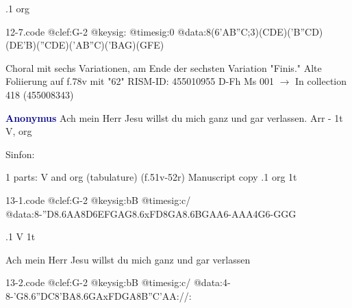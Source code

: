 \documentclass[twocolumn]{book}
\begin{document}
.1  org  
\begin{filecontents*}{12-7.code}
@clef:G-2
@keysig:
@timesig:0
@data:8(6{'AB''C};3)({CDE})({'B''CD})({DE'B})({''CDE})({'AB''C})({'BAG})({GFE})
\end{filecontents*}
\newline
%

\newline Choral mit sechs Variationen, am Ende der sechsten Variation "Finis."
\newline Alte Foliierung auf f.78v mit "62"
\newline RISM-ID: 455010955
\newline D-Fh  Ms 001
\newline $\rightarrow$ In collection 418 (455008343)
      
\newline \par \vspace{7pt} \textcolor{darkblue}{\textbf{Anonymus  }}
\newline Ach mein Herr Jesu willst du mich ganz und gar verlassen. Arr - 1t
\newline V, org
\newline \begin{itshape}[f.51v, at left:] Sinfon:\end{itshape} 
\newline \textcolor{darkblue}{}  1 parts: V and org (tabulature)  (f.51v-52r)
\newline Manuscript copy
.1  org  1t  
\begin{filecontents*}{13-1.code}
@clef:G-2
@keysig:bB
@timesig:c/
@data:8-''D{8.6AA8D6EF}{GAG8.6xFD}{8GA8.6BG}{AA}6-A{AA}4G6-{GGG}
\end{filecontents*}
\newline
%

.1  V  1t
\newline \begin{footnotesize} Ach mein Herr Jesu willst du mich ganz und gar verlassen \end{footnotesize}  
\begin{filecontents*}{13-2.code}
@clef:G-2
@keysig:bB
@timesig:c/
@data:4-8-'G{8.6''DC8'BA}{8.6GAxFD}{GA8B''C}{'AA}://:
\end{filecontents*}
\newline
%
\end{document}
